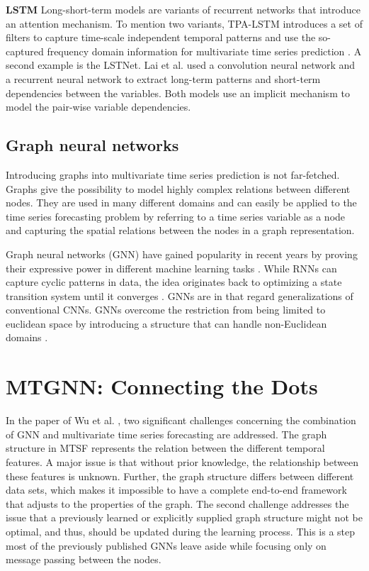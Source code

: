 \documentclass[letterpaper, twocolumn,11pt]{article}
\begin{document}
    \textbf{LSTM}  Long-short-term models are variants of recurrent networks that introduce an attention mechanism. To mention two variants, TPA-LSTM introduces a set of filters to capture time-scale independent temporal patterns and use the so-captured frequency domain information for multivariate time series prediction \cite{shih2019temporal}. A second example is the LSTNet. Lai et al. \cite{lai2018modeling} used a convolution neural network and a recurrent neural network to extract long-term patterns and short-term dependencies between the variables. Both models use an implicit mechanism to model the pair-wise variable dependencies.

    \subsection{Graph neural networks}
Introducing graphs into multivariate time series prediction is not far-fetched. Graphs give the possibility to model highly complex relations between different nodes. They are used in many different domains and can easily be applied to the time series forecasting problem by referring to a time series variable as a node and capturing the spatial relations between the nodes in a graph representation.

Graph neural networks (GNN) have gained popularity in recent years by proving their expressive power in different machine learning tasks \cite{zhou2020graph}. While RNNs can capture cyclic patterns in data, the idea originates back to optimizing a state transition system until it converges \cite{lecun1998gradient}. GNNs are in that regard generalizations of conventional CNNs. GNNs overcome the restriction from being limited to euclidean space by introducing a structure that can handle non-Euclidean domains \cite{bronstein2017geometric}.

    \section{MTGNN: Connecting the Dots}
    In the paper of Wu et al. \cite{wu2020connecting}, two significant challenges concerning the combination of GNN and multivariate
    time series forecasting are addressed.
    The graph structure in MTSF represents the relation between the different temporal features.
    A major issue is that without prior knowledge, the relationship between these features is unknown.
    Further, the graph structure differs between different data sets, which makes it impossible to have a complete end-to-end framework that adjusts to the properties of the graph.
    The second challenge addresses the issue that a previously learned or explicitly supplied graph structure might not be optimal, and thus,
    should be updated during the learning process.
    This is a step most of the previously published GNNs leave aside while focusing only on message passing between the nodes.
\end{document}
